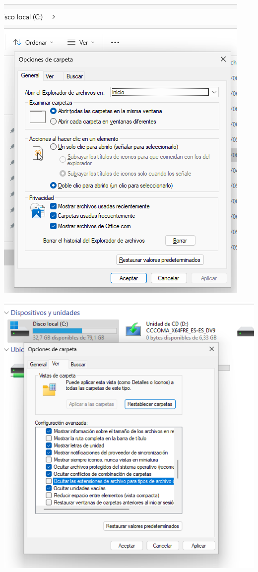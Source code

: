 \documentclass[
  a4paper,
]{article}
\begin{document}
\includegraphics{png/verOpcionesdecarpeta1.png}

\includegraphics{png/verOpcionesdecarpeta2.png}
\end{document}
